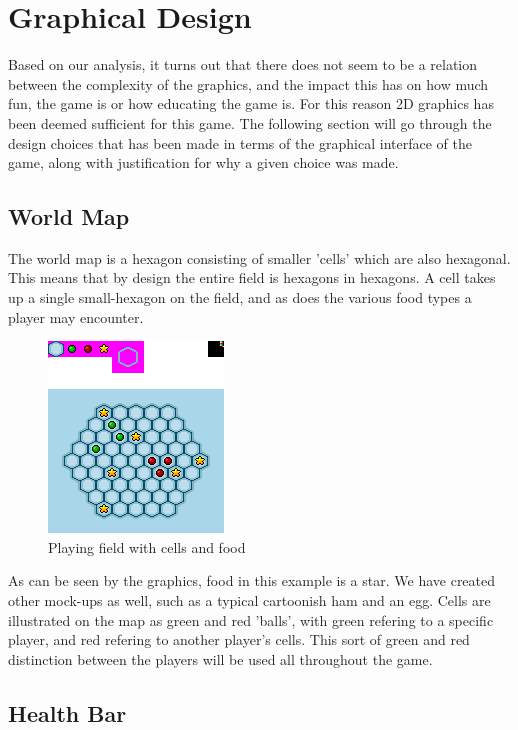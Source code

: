 \section{Graphical Design}

Based on our analysis, it turns out that there does not seem to be a relation between the complexity of the graphics, and the impact this has on how 
much fun, the game is or how educating the game is. For this reason 2D graphics has been deemed sufficient for this game. The following section will go 
through the design choices that has been made in terms of the graphical interface of the game, along with justification for why a given choice was made.

\subsection{World Map}

The world map is a hexagon consisting of smaller 'cells' which are also hexagonal. This means that by design the entire field is hexagons in hexagons. 
A cell takes up a single small-hexagon on the field, and as does the various food types a player may encounter.


\begin{figure}[h]
	\centering
		\includegraphics{img/cells_mockup.png}
	\caption{Playing field with cells and food}
	\label{fig:cells_mockup}
\end{figure}

As can be seen by the graphics, food in this example is a star. We have created other mock-ups as well, such as a typical cartoonish ham and an egg. 
Cells are illustrated on the map as green and red 'balls', with green refering to a specific player, and red refering to another player's cells. This 
sort of green and red distinction between the players will be used all throughout the game.


\subsection{Health Bar}

